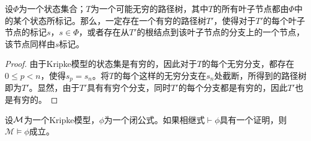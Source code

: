 \begin{proposition}[可能无穷的路径树到有穷路径树]\label{prop:ift}
	设$\Phi$为一个状态集合；$T$为一个可能无穷的路径树，其中$T$的所有叶子节点都由$\Phi$中的某个状态所标记。那么，一定存在一个有穷的路径树$T'$，使得对于$T'$的每个叶子节点的标记$s$，$s\in\Phi$，或者存在从$T'$的根结点到该叶子节点的分支上的一个节点，该节点同样由$s$标记。
\end{proposition}
\begin{proof}
	由于Kripke模型的状态集是有穷的，因此对于$T$的每个无穷分支，都存在$0\le p<n$，使得$s_p=s_n$。将$T$的每个这样的无穷分支在$s_n$处截断，所得到的路径树即为$T'$。显然，由于$T'$具有有穷个分支，同时$T'$的每个分支都是有穷的，因此$T'$也是有穷的。
\end{proof}

\begin{theorem}[可靠性]\label{thm:sound}
	设$\cal M$为一个Kripke模型，$\phi$为一个\ctlpm{}闭公式。如果相继式$\vdash\phi$具有一个证明，则$\mathcal{M}\models\phi$成立。
\end{theorem}
